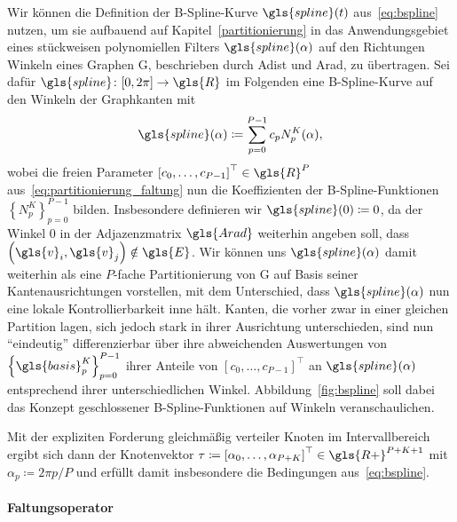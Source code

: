 Wir können die Definition der B-Spline-Kurve $\gls{spline}\left(t\right)$ aus~\eqref{eq:bspline} nutzen, um sie aufbauend auf Kapitel~\ref{partitionierung} in das Anwendungsgebiet eines stückweisen polynomiellen Filters $\gls{spline}\left(\alpha\right)$ auf den Richtungen \bzw{} Winkeln eines Graphen \gls{G}, beschrieben durch \gls{Adist} und \gls{Arad}, zu übertragen.
Sei dafür $\gls{spline} \colon \left[0, 2\pi\right] \to \gls{R}$ im Folgenden eine B-Spline-Kurve auf den Winkeln der Graphkanten mit
\begin{equation*}
  \gls{spline}\left(\alpha\right) \coloneqq \sum_{p=0}^{P-1} c_p N_p^K\left(\alpha\right),
\end{equation*}
wobei die freien Parameter ${\left[c_0, \ldots, c_{P-1}\right]}^{\top} \in \gls{R}^{P}$ aus~\eqref{eq:partitionierung_faltung} nun die Koeffizienten der B-Spline-Funktionen ${\left\{N_p^K\right\}}_{p=0}^{P-1}$ bilden.
Insbesondere definieren wir $\gls{spline}\left(0\right) \coloneqq 0$, da der Winkel $0$ in der Adjazenzmatrix $\gls{Arad}$ weiterhin angeben soll, dass $\left(\gls{v}_i, \gls{v}_j\right) \notin \gls{E}$.
Wir können uns $\gls{spline}\left(\alpha\right)$ damit weiterhin als eine $P$-fache Partitionierung von \gls{G} auf Basis seiner Kantenausrichtungen vorstellen, mit dem Unterschied, dass $\gls{spline}\left(\alpha\right)$ nun eine lokale Kontrollierbarkeit inne hält.
Kanten, die vorher zwar in einer gleichen Partition lagen, sich jedoch \evtl{} stark in ihrer Ausrichtung unterschieden, sind nun \enquote{eindeutig} differenzierbar über ihre abweichenden Auswertungen von ${\left\{\gls{basis}_p^K\right\}}_{p=0}^{P-1}$ \bzw{} ihrer Anteile von ${\left[c_0, \ldots, c_{P-1}\right]}^{\top}$ an $\gls{spline}\left(\alpha\right)$ entsprechend ihrer unterschiedlichen Winkel.
Abbildung~\ref{fig:bspline} soll dabei das Konzept geschlossener B-Spline-Funktionen auf Winkeln veranschaulichen.

Mit der expliziten Forderung gleichmäßig verteiler Knoten im Intervallbereich ergibt sich dann der Knotenvektor $\ve{\tau} \coloneqq {\left[\alpha_0, \ldots, \alpha_{P+K}\right]}^{\top} \in \gls{R+}^{P+K+1}$ mit $\alpha_p \coloneqq 2\pi p/P$ und erfüllt damit insbesondere die Bedingungen aus~\eqref{eq:bspline}.

\paragraph{Faltungsoperator}
\label{bspline_faltungsoperator}

